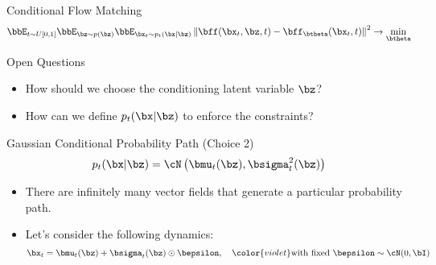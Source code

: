 \documentclass{beamer}
\begin{document}
\begin{frame}{Conditional Flow Matching}
	\vspace{-0.3cm}
	\[
		\bbE_{t \sim U[0, 1]} \bbE_{\bz \sim p(\bz)} \bbE_{\bx_t \sim p_t(\bx | \bz)}\left\| \bff(\bx_t, \bz, t) - \bff_{\btheta}(\bx_t, t) \right\|^2 \rightarrow \min_{\btheta}
	\]
	\eqpause
	\vspace{-0.4cm}
	\begin{block}{Open Questions}
		\begin{itemize}
			\item How should we choose the conditioning latent variable $\bz$?
			\item How can we define $p_t(\bx | \bz)$ to enforce the constraints?
		\end{itemize}
	\end{block}
	\eqpause
	\vspace{-0.3cm}
	\begin{block}{Gaussian Conditional Probability Path (Choice 2)}
		\vspace{-0.3cm}
		\[
			p_t(\bx | \bz) = \cN\left(\bmu_t(\bz), \bsigma_t^2(\bz)\right)
		\]
		\eqpause
		\vspace{-0.5cm}
	\end{block}
	\begin{itemize}
		\item There are infinitely many vector fields that generate a particular probability path.
		\item Let's consider the following dynamics:
		\[
			\bx_t = \bmu_t(\bz) + \bsigma_t(\bz) \odot \bepsilon, \quad {\color{violet} \text{with fixed } \bepsilon \sim \cN(0, \bI)}
		\]
	\end{itemize}
\end{frame}
\end{document}
